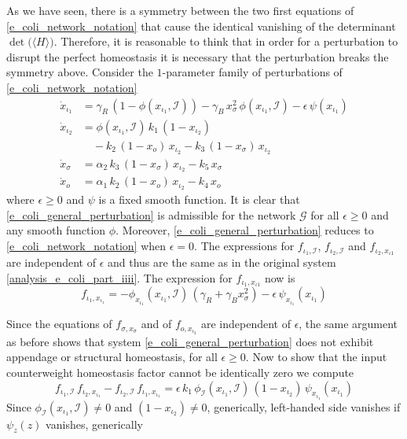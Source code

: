 \documentclass[a4paper,fleqn]{cas-dc}
\begin{document}
As we have seen, there is a symmetry between the two first equations of \eqref{e_coli_network_notation} that cause the identical vanishing of the determinant 
$\det\!\big(\langle H \rangle \big)$.
Therefore, it is reasonable to think that in order for a perturbation to disrupt the perfect homeostasis it is necessary that the perturbation breaks the symmetry above.
Consider the $1$-parameter family of perturbations of \eqref{e_coli_network_notation}
\begin{equation} \label{e_coli_general_perturbation}
\begin{aligned}
\dot{x}_{\iota_1} & = \gamma_{R}  \, (1 - \phi(x_{\iota_1}, \mathcal{I})) - \gamma_{B} \, x_{\sigma}^{2} \, \phi(x_{\iota_1}, \mathcal{I}) -\epsilon \, \psi(x_{\iota_{1}}) \\
\dot{x}_{\iota_{2}} & = \phi(x_{\iota_1}, \mathcal{I}) \, k_{1} \, (1 - x_{\iota_2}) \\
& \quad - k_{2} \, (1 - x_{o}) \, x_{\iota_2} - k_{3} \, (1 - x_{\sigma}) \, x_{\iota_2} \\
\dot{x}_{\sigma} & = \alpha_{2} \, k_{3} \, (1 - x_{\sigma}) \, x_{\iota_2} - k_{5} \, x_{\sigma} \\
\dot{x}_{o} & = \alpha_{1} \, k_{2} \, (1 - x_{o}) \, x_{\iota_2} - k_{4} \, x_{o}
\end{aligned}
\end{equation}
where $\epsilon \geqslant 0$ and $\psi$ is a fixed smooth function. 
It is clear that \eqref{e_coli_general_perturbation} is admissible for the network $\mathcal{G}$ for all $\epsilon \geqslant 0$ and any smooth function $\phi$.
Moreover, \eqref{e_coli_general_perturbation} reduces to \eqref{e_coli_network_notation} when $\epsilon=0$.
The expressions for $f_{\iota_{1}, \mathcal{I}}$, $f_{\iota_{2}, \mathcal{I}}$ and $f_{\iota_{2}, x_{\iota{1}}}$ are independent of $\epsilon$ and thus are the same as in the original system \eqref{analysis_e_coli_part_iiii}. 
The expression for $f_{\iota_{1}, x_{\iota{1}}}$ now is
\begin{equation} \label{new_formula_derivative}
f_{\iota_{1}, x_{\iota_1}} = -\phi_{x_{\iota_1}} (x_{\iota_1},\mathcal{I}) \, (\gamma_{R} + \gamma_{B}x_{\sigma}^{2}) - \epsilon \, \psi_{x_{\iota_{1}}}(x_{\iota_{1}})
\end{equation}

Since the equations of $f_{\sigma, x_{\sigma}}$ and of $f_{o, x_{\iota_{2}}}$ are independent of $\epsilon$, the same argument as before shows that system \eqref{e_coli_general_perturbation} does not exhibit appendage or structural homeostasis, for all $\epsilon \geqslant 0$. 
Now to show that the input counterweight homeostasis factor cannot be identically zero we compute
\begin{equation*} \label{final_analysis_e_coli_not_generic_part_i}
 f_{\iota_{1}, \mathcal{I}} \, f_{\iota_{2}, x_{\iota_{1}}} - f_{\iota_{2}, \mathcal{I}} \, f_{\iota_{1}, x_{\iota_{1}}} = \epsilon \, k_{1} \, \phi_{\mathcal{I}} (x_{\iota_1},\mathcal{I}) \, (1 - x_{\iota_2}) 
 \, \psi_{x_{\iota_{1}}}(x_{\iota_{1}})
\end{equation*}
Since $\phi_{\mathcal{I}} (x_{\iota_1},\mathcal{I}) \neq 0$ and $(1 - x_{\iota_2}) \neq 0$, generically, left-handed side vanishes if $\psi_z(z)$ vanishes, generically
\end{document}

